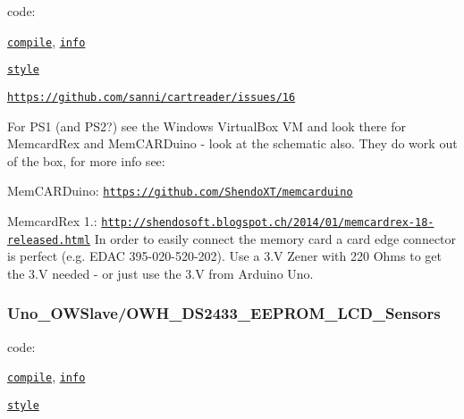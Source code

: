 code\-:
\begin{DoxyItemize}
\item \href{https://github.com/drtrigon/sketchbook/blob/result/docu/Uno_N64_Controller_Pak_Reader/Uno_N64_Controller_Pak_Reader.ino.compile}{\tt compile}, \href{https://github.com/drtrigon/sketchbook/blob/result/docu/Uno_N64_Controller_Pak_Reader/Uno_N64_Controller_Pak_Reader.ino.info}{\tt info}
\item \href{https://github.com/drtrigon/sketchbook/blob/result/docu/Uno_N64_Controller_Pak_Reader/Uno_N64_Controller_Pak_Reader.ino.style}{\tt style}
\end{DoxyItemize}

\href{https://github.com/sanni/cartreader/issues/16}{\tt https\-://github.\-com/sanni/cartreader/issues/16}

For P\-S1 (and P\-S2?) see the Windows Virtual\-Box V\-M and look there for Memcard\-Rex and Mem\-C\-A\-R\-Duino -\/ look at the schematic also. They do work out of the box, for more info see\-:
\begin{DoxyItemize}
\item Mem\-C\-A\-R\-Duino\-: \href{https://github.com/ShendoXT/memcarduino}{\tt https\-://github.\-com/\-Shendo\-X\-T/memcarduino}
\item Memcard\-Rex 1.\-: \href{http://shendosoft.blogspot.ch/2014/01/memcardrex-18-released.html}{\tt http\-://shendosoft.\-blogspot.\-ch/2014/01/memcardrex-\/18-\/released.\-html} In order to easily connect the memory card a card edge connector is perfect (e.\-g. E\-D\-A\-C 395-\/020-\/520-\/202). Use a 3.\-V Zener with 220 Ohms to get the 3.\-V needed -\/ or just use the 3.\-V from Arduino Uno.
\end{DoxyItemize}

\subsubsection*{Uno\-\_\-\-O\-W\-Slave/\-O\-W\-H\-\_\-\-D\-S2433\-\_\-\-E\-E\-P\-R\-O\-M\-\_\-\-L\-C\-D\-\_\-\-Sensors}

code\-:
\begin{DoxyItemize}
\item \href{https://github.com/drtrigon/sketchbook/blob/result/docu/Uno_OWSlave/OWH_DS2433_EEPROM_LCD_Sensors/OWH_DS2433_EEPROM_LCD_Sensors.ino.compile}{\tt compile}, \href{https://github.com/drtrigon/sketchbook/blob/result/docu/Uno_OWSlave/OWH_DS2433_EEPROM_LCD_Sensors/OWH_DS2433_EEPROM_LCD_Sensors.ino.info}{\tt info}
\item \href{https://github.com/drtrigon/sketchbook/blob/result/docu/Uno_OWSlave/OWH_DS2433_EEPROM_LCD_Sensors/OWH_DS2433_EEPROM_LCD_Sensors.ino.style}{\tt style}
\end{DoxyItemize}

